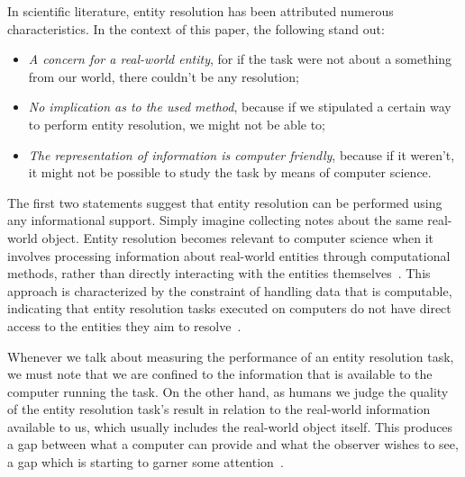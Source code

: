 In scientific literature, entity resolution has been attributed numerous
characteristics\cite{Tal11,Pap19}.
In the context of this paper, the following stand out:

\begin{itemize}
    \item\textit{A concern for a real-world entity}, for if the task were
    not about a something from our world, there couldn't be any resolution;
    \item\textit{No implication as to the used method}, because if we
    stipulated a certain way to perform entity resolution, we might not be
    able to;
    \item\textit{The representation of information is computer friendly},
    because if it weren't, it might not be possible to study the task by
    means of computer science.
\end{itemize}

The first two statements suggest that entity resolution can be performed
using any informational support.
Simply imagine collecting notes about the same real-world object.
Entity resolution becomes relevant to computer science when it involves
processing information about real-world entities through computational
methods, rather than directly interacting with the entities
themselves~\cite{Tal11}.
This approach is characterized by the constraint of handling data that is
computable, indicating that entity resolution tasks executed on computers
do not have direct access to the entities they aim to resolve~\cite{Chen09}.

Whenever we talk about measuring the performance of an entity resolution
task, we must note that we are confined to the information that is available
to the computer running the task.
On the other hand, as humans we judge the quality of the entity resolution
task's result in relation to the real-world information available to us, which
usually includes the real-world object itself.
This produces a gap between what a computer can provide and what the
observer wishes to see, a gap which is starting to garner some
attention~\cite{wang2022realideal}.

